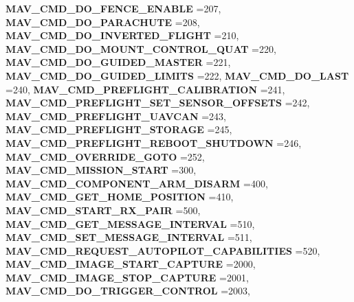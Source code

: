 \begin{DoxyCompactItemize}
\textbf{ M\+A\+V\+\_\+\+C\+M\+D\+\_\+\+D\+O\+\_\+\+F\+E\+N\+C\+E\+\_\+\+E\+N\+A\+B\+LE} =207, 
\textbf{ M\+A\+V\+\_\+\+C\+M\+D\+\_\+\+D\+O\+\_\+\+P\+A\+R\+A\+C\+H\+U\+TE} =208, 
\newline
\textbf{ M\+A\+V\+\_\+\+C\+M\+D\+\_\+\+D\+O\+\_\+\+I\+N\+V\+E\+R\+T\+E\+D\+\_\+\+F\+L\+I\+G\+HT} =210, 
\textbf{ M\+A\+V\+\_\+\+C\+M\+D\+\_\+\+D\+O\+\_\+\+M\+O\+U\+N\+T\+\_\+\+C\+O\+N\+T\+R\+O\+L\+\_\+\+Q\+U\+AT} =220, 
\textbf{ M\+A\+V\+\_\+\+C\+M\+D\+\_\+\+D\+O\+\_\+\+G\+U\+I\+D\+E\+D\+\_\+\+M\+A\+S\+T\+ER} =221, 
\textbf{ M\+A\+V\+\_\+\+C\+M\+D\+\_\+\+D\+O\+\_\+\+G\+U\+I\+D\+E\+D\+\_\+\+L\+I\+M\+I\+TS} =222, 
\newline
\textbf{ M\+A\+V\+\_\+\+C\+M\+D\+\_\+\+D\+O\+\_\+\+L\+A\+ST} =240, 
\textbf{ M\+A\+V\+\_\+\+C\+M\+D\+\_\+\+P\+R\+E\+F\+L\+I\+G\+H\+T\+\_\+\+C\+A\+L\+I\+B\+R\+A\+T\+I\+ON} =241, 
\textbf{ M\+A\+V\+\_\+\+C\+M\+D\+\_\+\+P\+R\+E\+F\+L\+I\+G\+H\+T\+\_\+\+S\+E\+T\+\_\+\+S\+E\+N\+S\+O\+R\+\_\+\+O\+F\+F\+S\+E\+TS} =242, 
\textbf{ M\+A\+V\+\_\+\+C\+M\+D\+\_\+\+P\+R\+E\+F\+L\+I\+G\+H\+T\+\_\+\+U\+A\+V\+C\+AN} =243, 
\newline
\textbf{ M\+A\+V\+\_\+\+C\+M\+D\+\_\+\+P\+R\+E\+F\+L\+I\+G\+H\+T\+\_\+\+S\+T\+O\+R\+A\+GE} =245, 
\textbf{ M\+A\+V\+\_\+\+C\+M\+D\+\_\+\+P\+R\+E\+F\+L\+I\+G\+H\+T\+\_\+\+R\+E\+B\+O\+O\+T\+\_\+\+S\+H\+U\+T\+D\+O\+WN} =246, 
\textbf{ M\+A\+V\+\_\+\+C\+M\+D\+\_\+\+O\+V\+E\+R\+R\+I\+D\+E\+\_\+\+G\+O\+TO} =252, 
\textbf{ M\+A\+V\+\_\+\+C\+M\+D\+\_\+\+M\+I\+S\+S\+I\+O\+N\+\_\+\+S\+T\+A\+RT} =300, 
\newline
\textbf{ M\+A\+V\+\_\+\+C\+M\+D\+\_\+\+C\+O\+M\+P\+O\+N\+E\+N\+T\+\_\+\+A\+R\+M\+\_\+\+D\+I\+S\+A\+RM} =400, 
\textbf{ M\+A\+V\+\_\+\+C\+M\+D\+\_\+\+G\+E\+T\+\_\+\+H\+O\+M\+E\+\_\+\+P\+O\+S\+I\+T\+I\+ON} =410, 
\textbf{ M\+A\+V\+\_\+\+C\+M\+D\+\_\+\+S\+T\+A\+R\+T\+\_\+\+R\+X\+\_\+\+P\+A\+IR} =500, 
\textbf{ M\+A\+V\+\_\+\+C\+M\+D\+\_\+\+G\+E\+T\+\_\+\+M\+E\+S\+S\+A\+G\+E\+\_\+\+I\+N\+T\+E\+R\+V\+AL} =510, 
\newline
\textbf{ M\+A\+V\+\_\+\+C\+M\+D\+\_\+\+S\+E\+T\+\_\+\+M\+E\+S\+S\+A\+G\+E\+\_\+\+I\+N\+T\+E\+R\+V\+AL} =511, 
\textbf{ M\+A\+V\+\_\+\+C\+M\+D\+\_\+\+R\+E\+Q\+U\+E\+S\+T\+\_\+\+A\+U\+T\+O\+P\+I\+L\+O\+T\+\_\+\+C\+A\+P\+A\+B\+I\+L\+I\+T\+I\+ES} =520, 
\textbf{ M\+A\+V\+\_\+\+C\+M\+D\+\_\+\+I\+M\+A\+G\+E\+\_\+\+S\+T\+A\+R\+T\+\_\+\+C\+A\+P\+T\+U\+RE} =2000, 
\textbf{ M\+A\+V\+\_\+\+C\+M\+D\+\_\+\+I\+M\+A\+G\+E\+\_\+\+S\+T\+O\+P\+\_\+\+C\+A\+P\+T\+U\+RE} =2001, 
\newline
\textbf{ M\+A\+V\+\_\+\+C\+M\+D\+\_\+\+D\+O\+\_\+\+T\+R\+I\+G\+G\+E\+R\+\_\+\+C\+O\+N\+T\+R\+OL} =2003, 

\end{DoxyCompactItemize}

